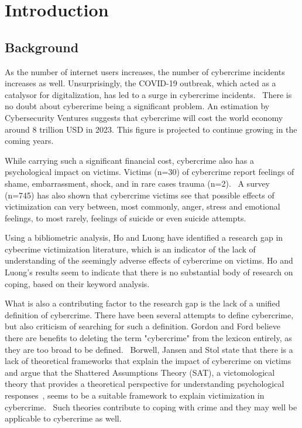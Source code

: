 \section{Introduction}

\subsection{Background}

As the number of internet users increases, the number of cybercrime incidents increases as well. Unsurprisingly, the COVID-19 outbreak, which acted as a catalysor for digitalization, has led to a surge in cybercrime incidents.~\citep{Monteith2021Increasing} There is no doubt about cybercrime being a significant problem. An estimation by Cybersecurity Ventures suggests that cybercrime will cost the world economy around 8 trillion USD in 2023. This figure is projected to continue growing in the coming years.~\citep{cybersecurity-ventures-cybercrime-report}

While carrying such a significant financial cost, cybercrime also has a psychological impact on victims. Victims (n=30) of cybercrime report feelings of shame, embarrassment, shock, and in rare cases trauma (n=2).~\citep{jansen2018coping} A survey (n=745) has also shown that cybercrime victims see that possible effects of victimization can very between, most commonly, anger, stress and emotional feelings, to most rarely, feelings of suicide or even suicide attempts.~\cite{button2014not} 

Using a bibliometric analysis, Ho and Luong have identified a research gap in cybecrime victimization literature, which is an indicator of the lack of understanding of the seemingly adverse effects of cybercrime on victims. Ho and Luong's results seem to indicate that there is no substantial body of research on coping, based on their keyword analysis.~\citep{horesearch}

What is also a contributing factor to the research gap is the lack of a unified definition of cybercrime. There have been several attempts to define cybercrime, but also criticism of searching for such a definition. Gordon and Ford believe there are benefits to deleting the term "cybercrime" from the lexicon entirely, as they are too broad to be defined.~\citep{gordon2006definition} Borwell, Jansen and Stol state that there is a lack of theoretical frameworks that explain the impact of cybercrime on victims and argue that the Shattered Assumptions Theory (SAT), a victomological theory that provides a theoretical perspective for understanding psychological responses~\citep{janoff1983theoretical}, seems to be a suitable framework to explain victimization in cybercrime.~\citep{borwell2022psychological} Such theories contribute to coping with crime and they may well be applicable to cybercrime as well.

